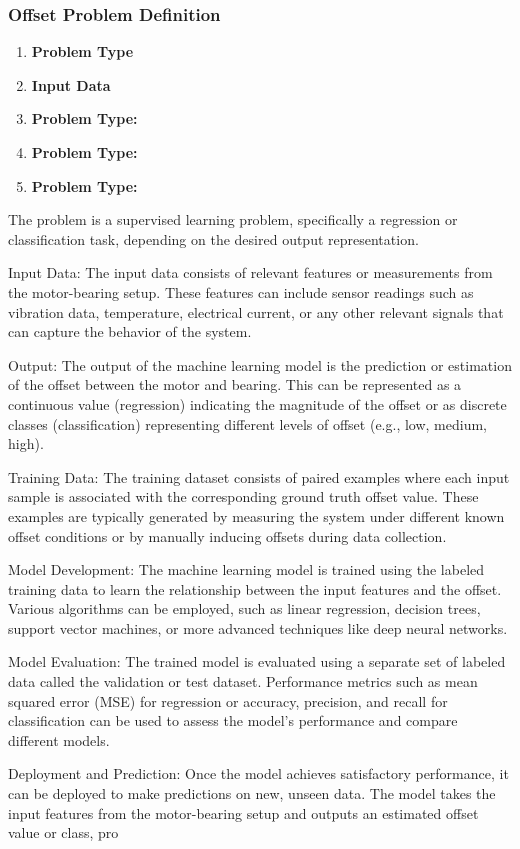 \documentclass[9pt]{beamer}
\begin{document}
\begin{frame}
\frametitle{Offset Problem Definition}

\begin{enumerate}
    \item   \textbf{Problem Type}
    \item   \textbf{Input Data}
    \item  \textbf{Problem Type:}
    \item \textbf{Problem Type:}
    \item \textbf{Problem Type:}
    
\end{enumerate}
 The problem is a supervised learning problem, specifically a regression or classification task, depending on the desired output representation.

Input Data: The input data consists of relevant features or measurements from the motor-bearing setup. These features can include sensor readings such as vibration data, temperature, electrical current, or any other relevant signals that can capture the behavior of the system.

Output: The output of the machine learning model is the prediction or estimation of the offset between the motor and bearing. This can be represented as a continuous value (regression) indicating the magnitude of the offset or as discrete classes (classification) representing different levels of offset (e.g., low, medium, high).

Training Data: The training dataset consists of paired examples where each input sample is associated with the corresponding ground truth offset value. These examples are typically generated by measuring the system under different known offset conditions or by manually inducing offsets during data collection.

Model Development: The machine learning model is trained using the labeled training data to learn the relationship between the input features and the offset. Various algorithms can be employed, such as linear regression, decision trees, support vector machines, or more advanced techniques like deep neural networks.

Model Evaluation: The trained model is evaluated using a separate set of labeled data called the validation or test dataset. Performance metrics such as mean squared error (MSE) for regression or accuracy, precision, and recall for classification can be used to assess the model's performance and compare different models.

Deployment and Prediction: Once the model achieves satisfactory performance, it can be deployed to make predictions on new, unseen data. The model takes the input features from the motor-bearing setup and outputs an estimated offset value or class, pro



\end{frame}
\end{document}
